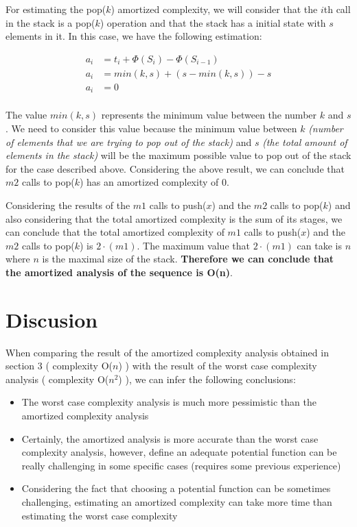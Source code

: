 \documentclass[12p]{report}
\begin{document}
For estimating the pop($k$) amortized complexity, we will consider that the $i$th call in the stack is a pop($k$) operation and that the stack has a initial state with $s$ elements in it. In this case, we have the following estimation:

\Large
\begin{align}
\nonumber
a_{i} &= t_{i} + \Phi(S_{i}) - \Phi(S_{i-1}) \\
\nonumber
a_{i} &= min(k,s) + (s- min(k,s)) - s \\
\nonumber
a_{i} &= 0 \\
\nonumber
\end{align}

\large
The value $min(k,s)$ represents the minimum value between the number $k$ and $s$. We need to consider this value because the minimum value between $k$ \textit{(number of elements that we are trying to pop out of the stack)} and $s$ \textit{(the total amount of elements in the stack)} will be the maximum possible value to pop out of the stack for the case described above. Considering the above result, we can conclude that $m2$ calls to pop($k$) has an amortized complexity of 0. 

\bigskip

Considering the results of the $m1$ calls to push($x$) and the $m2$ calls to pop($k$) and also considering that the total amortized complexity is the sum of its stages, we can conclude that the total amortized complexity of $m1$ calls to push($x$) and the $m2$ calls to pop($k$) is $2\cdot(m1)$. The maximum value that $2\cdot(m1)$ can take is $n$ where $n$ is the maximal size of the stack. \textbf{Therefore we can conclude that the amortized analysis of the sequence is O(n)}.


 
  \section{Discusion}			%

When comparing the result of the amortized complexity analysis obtained in section 3 ( complexity O($n$) ) with the result of the worst case complexity analysis ( complexity O($n^2$) ), we can infer the following conclusions:

\begin{itemize}
   \item The worst case complexity analysis is much more pessimistic than the amortized complexity analysis
   \item Certainly, the amortized analysis is more accurate than the worst case complexity analysis, however, define an adequate potential function can be really challenging in some specific cases (requires some previous experience)
   \item Considering the fact that choosing a potential function can be sometimes challenging, estimating an amortized complexity can take more time than estimating the worst case complexity
\end{itemize}
\end{document}
